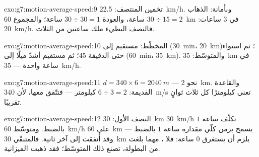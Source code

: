 \begin{solution}{exo:g7:motion-average-speed:9}
تخمين المنتصف: \qty{22.5}{km/h}. وبأمانة: الذهاب $30 \div 15 =
2$ ساعة، والعودة $30 \div 30 = 1$ ساعة؛ والمجموع \qty{60}{km}
في $3$ ساعات: \qty{20}{km/h}. فالنصف البطيء ملك ساعتين من
الثلاث.
\end{solution}

\begin{solution}{exo:g7:motion-average-speed:10}
المخطّط: مستقيم إلى (\qty{30}{min}، \qty{20}{km})؛ ثم استواء
حتى الدقيقة $45$؛ ثم مستقيم أشدّ ميلًا إلى (\qty{60}{min}،
\qty{35}{km}). والمتوسّط: \qty{35}{km} في ساعة واحدة ---
\qty{35}{km/h}.
\end{solution}

\begin{solution}{exo:g7:motion-average-speed:11}
$d = 340 \times 6 = \qty{2040}{m}$ --- نحو \qty{2}{km}.
والقاعدة القديمة: $6 \div 3 = 2$ كيلومتر --- فتتّفق معها، لأن
\qty{340}{m/s} تعني كيلومترًا كل ثلاث ثوانٍ تقريبًا.
\end{solution}

\begin{solution}{exo:g7:motion-average-speed:12}
النصف الأول: \qty{30}{km}  \qty{30}{km/h} تكلّف ساعة $1$
بالضبط. ومتوسّط \qty{60}{km/h} على \qty{60}{km} يسمح بزمن كلّي
مقداره ساعة $1$ بالضبط --- وقد أُنفقت إلى آخر ثانية. فالمتبقّي
\qty{30}{km} يلزم أن يستغرق $0$ ساعة: فلا ، مهما بلغت من
البطولة، تصنع ذلك المتوسّط؛ فقد ذهبت الميزانية.
\end{solution}

